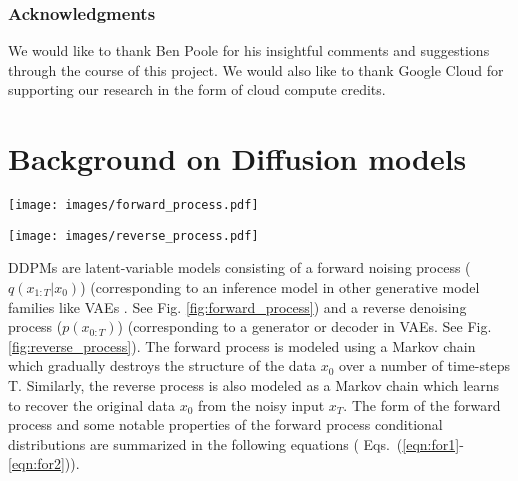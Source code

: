 \documentclass[10pt]{article} \usepackage[accepted]{tmlr}
\begin{document}
\subsubsection*{Acknowledgments}
We would like to thank Ben Poole for his insightful comments and suggestions through the course of this project. We would also like to thank Google Cloud for supporting our research in the form of cloud compute credits.




\newpage

\appendix
\section{Background on Diffusion models}
\label{sec:appendix_a}

\begin{figure*}
  \centering
  \begin{minipage}{0.45\linewidth}
    \texttt{[image: images/forward\_process.pdf]}
    \caption{Forward Process}
    \label{fig:forward_process}
  \end{minipage}
  \hfill
  \begin{minipage}{0.45\linewidth}
    \texttt{[image: images/reverse\_process.pdf]}
    \caption{Reverse Process}
    \label{fig:reverse_process}
  \end{minipage}
\end{figure*}

DDPMs \citep{sohldickstein2015deep, ho2020denoising} are latent-variable models consisting of a forward noising process ($q(x_{1:T}|x_0)$) (corresponding to an inference model in other generative model families like VAEs \citep{kingma2014autoencoding, rezende2016variational}. See Fig. \ref{fig:forward_process}) and a reverse denoising process ($p(x_{0:T})$) (corresponding to a generator or decoder in VAEs. See Fig. \ref{fig:reverse_process}). The forward process is modeled using a Markov chain which gradually destroys the structure of the data $x_0$ over a number of time-steps T. Similarly, the reverse process is also modeled as a Markov chain which learns to recover the original data $x_0$ from the noisy input $x_T$. The form of the forward process and some notable properties of the forward process conditional distributions are summarized in the following equations ( Eqs.~(\ref{eqn:for1}-\ref{eqn:for2})).
\end{document}
